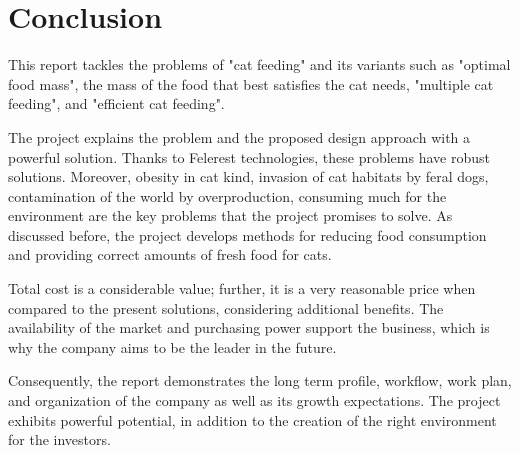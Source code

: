 \section{Conclusion}
\label{sec:conclusion}

This report tackles the problems of "cat feeding" and  its variants such as "optimal food mass", the mass of the food that best satisfies the cat needs, "multiple cat feeding", and "efficient cat feeding".

The project explains the problem and the proposed design approach with a powerful solution. Thanks to Felerest technologies, these problems have robust solutions. Moreover, obesity in cat kind, invasion of cat habitats by feral dogs, contamination of the world by overproduction, consuming much for the environment are the key problems that the project promises to solve. As discussed before, the project develops methods for reducing food consumption and providing correct amounts of fresh food for cats.

Total cost is a considerable value; further, it is a very reasonable price when compared to the present solutions, considering additional benefits. The availability of the market and purchasing power support the business, which is why the company aims to be the leader in the future.

Consequently, the report demonstrates the long term profile, workflow, work plan, and organization of the company as well as its growth expectations. The project exhibits powerful potential, in addition to the creation of the right environment for the investors.